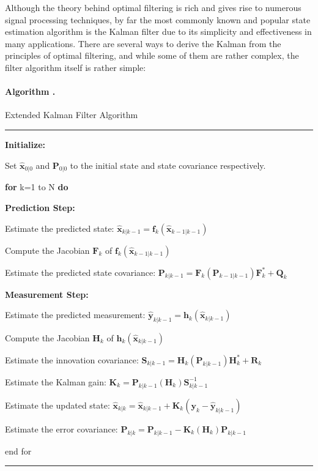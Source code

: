 \documentclass[11pt]{article}
\newcounter{algo}
\renewcommand{\thealgo}{\arabic{algo}.}
\newenvironment{algorithm}[1]{%
    \refstepcounter{algo}%
    \paragraph{Algorithm \thealgo}#1%
    \vspace{2pt}\hrule\vspace{5pt}%
    \begin{level}
}{%
    \end{level}%
    \vspace{5pt}\hrule\vspace{\baselineskip}%
}
\begin{document}
Although the theory behind optimal filtering is rich and gives rise to numerous signal processing techniques, by far the most commonly known and popular state estimation algorithm is the Kalman filter due to its simplicity and effectiveness in many applications. There are several ways to derive the Kalman from the principles of optimal filtering, and while some of them are rather complex, the filter algorithm itself is rather simple:

\begin{algorithm}{Extended Kalman Filter Algorithm}\label{algo:ekf}
    \item \textbf{Initialize:}
    \item Set $\mathbf{\hat{x}}_{0|0}$ and $\mathbf{P}_{0|0}$ to the initial state and state covariance respectively.
    \item \textbf{for} k=1 to N \textbf{do}
    \begin{level}
        \item \textbf{Prediction Step:}
        \item Estimate the predicted state: $\mathbf{\hat{x}}_{k|k-1} = \mathbf{f}_{k}(\mathbf{\hat{x}}_{k-1|k-1})$
        \item Compute the Jacobian $\mathbf{F}_{k}$ of $\mathbf{f}_{k}(\mathbf{\hat{x}}_{k-1|k-1})$
        \item Estimate the predicted state covariance: $\mathbf{P}_{k|k-1} = \mathbf{F}_{k}(\mathbf{P}_{k-1|k-1})\mathbf{F}_{k}^* + \mathbf{Q}_{k}$
        \item \textbf{Measurement Step:}
        \item Estimate the predicted measurement: $\mathbf{\hat{y}}_{k|k-1} = \mathbf{h}_{k}(\mathbf{\hat{x}}_{k|k-1})$
        \item Compute the Jacobian $\mathbf{H}_{k}$ of $\mathbf{h}_{k}(\mathbf{\hat{x}}_{k|k-1})$
        \item Estimate the innovation covariance: $\mathbf{S}_{k|k-1} = \mathbf{H}_{k}(\mathbf{P}_{k|k-1})\mathbf{H}_{k}^* + \mathbf{R}_{k}$
        \item Estimate the Kalman gain: $\mathbf{K}_{k} = \mathbf{P}_{k|k-1}(\mathbf{H}_{k})\mathbf{S}_{k|k-1}^{-1}$
        \item Estimate the updated state: $\mathbf{\hat{x}}_{k|k} = \mathbf{\hat{x}}_{k|k-1} + \mathbf{K}_{k}(\mathbf{y}_k - \mathbf{\hat{y}}_{k|k-1})$
        \item Estimate the error covariance: $\mathbf{P}_{k|k} = \mathbf{P}_{k|k-1} - \mathbf{K}_{k}(\mathbf{H}_{k})\mathbf{P}_{k|k-1}$
    \end{level}
    \item end for
\end{algorithm}
\end{document}

